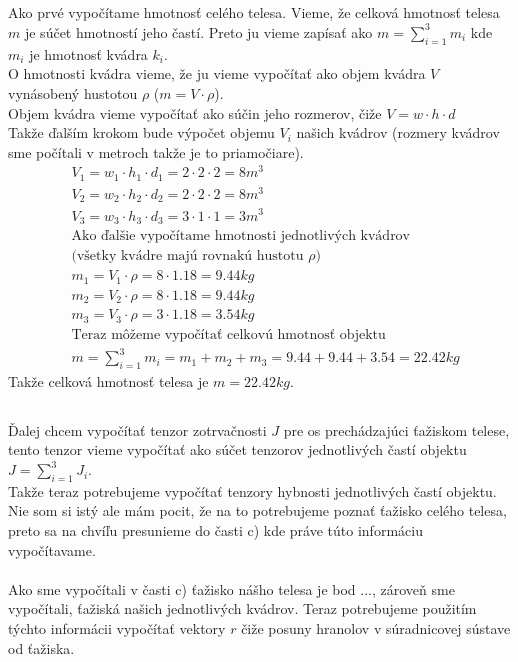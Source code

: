 \documentclass[a4paper]{article}
\begin{document}
	\subsection{}
	
	Ako prvé vypočítame hmotnosť celého telesa. Vieme, že celková hmotnosť telesa $m$ je súčet hmotností jeho častí. Preto ju vieme zapísať ako $m=\sum_{i=1}^{3}m_i$ kde $m_i$ je hmotnosť kvádra $k_i$.
	\\
	O hmotnosti kvádra vieme, že ju vieme vypočítať ako objem kvádra $V$ vynásobený hustotou $\rho$ ($m = V \cdot \rho$). 
	\\
	Objem kvádra vieme vypočítať ako súčin jeho rozmerov, čiže $V=w \cdot h \cdot d$
	\\
	Takže ďalším krokom bude výpočet objemu $V_i$ našich kvádrov (rozmery kvádrov sme počítali v metroch takže je to priamočiare). 
	\begin{align*}
		&V_1 = w_1 \cdot h_1 \cdot d_1 = 2 \cdot 2 \cdot 2 = 8 m^3 
		\\
		&V_2 = w_2 \cdot h_2 \cdot d_2 = 2 \cdot 2 \cdot 2 = 8 m^3 
		\\
		&V_3 = w_3 \cdot h_3 \cdot d_3 = 3 \cdot 1 \cdot 1 = 3 m^3
		\\
		&\text{Ako ďalšie vypočítame hmotnosti jednotlivých kvádrov}
		\\
		&\text{(všetky kvádre majú rovnakú hustotu $\rho$)} 
		\\
		&m_1 = V_1 \cdot \rho = 8 \cdot 1.18 = 9.44 kg
		\\
		&m_2 = V_2 \cdot \rho = 8 \cdot 1.18 = 9.44 kg
		\\
		&m_3 = V_3 \cdot \rho = 3 \cdot 1.18 = 3.54 kg
		\\
		&\text{Teraz môžeme vypočítať celkovú hmotnosť objektu}
		\\
		&m = \sum_{i=1}^{3} m_i = m_1 + m_2 + m_3 = 9.44 + 9.44 + 3.54 = 22.42 kg
	\end{align*}  
	Takže celková hmotnosť telesa je $m = 22.42 kg$.
	
	\subsection{}
	
	Ďalej chcem vypočítať tenzor zotrvačnosti $J$ pre os prechádzajúci ťažiskom telese, tento tenzor vieme vypočítať ako súčet tenzorov jednotlivých častí objektu $J = \sum_{i=1}^{3} J_i$.
	\\
	Takže teraz potrebujeme vypočítať tenzory hybnosti jednotlivých častí objektu. Nie som si istý ale mám pocit, že na to potrebujeme poznať ťažisko celého telesa, preto sa na chvíľu presunieme do časti c) kde práve túto informáciu vypočítavame.
	\\
	\\
	Ako sme  vypočítali v časti c) ťažisko nášho telesa je bod $...$, zároveň sme vypočítali, ťažiská našich jednotlivých kvádrov. Teraz potrebujeme použitím týchto informácii vypočítať vektory $r$ čiže posuny hranolov v súradnicovej sústave od ťažiska.
	
	\subsection{}
	
\end{document}
